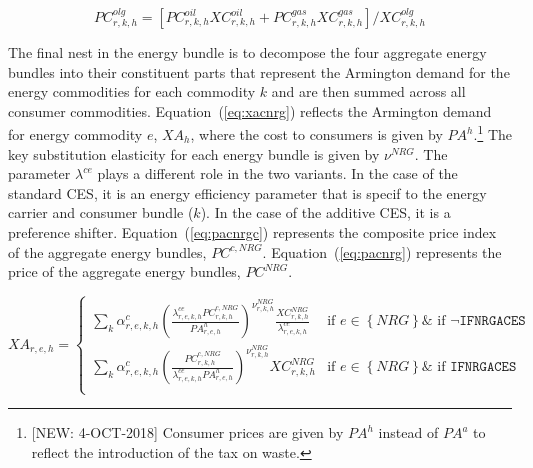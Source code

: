 \documentclass[11pt,letterpaper]{report}
\begin{document}
\begin{equation}
\label{eq:pcolg}
\mathit{PC}^{\mathit{olg}}_{r,k,h} =
\left[
\mathit{PC}^{\mathit{oil}}_{r,k,h} \mathit{XC}^{\mathit{oil}}_{r,k,h}
+ \mathit{PC}^{\mathit{gas}}_{r,k,h} \mathit{XC}^{\mathit{gas}}_{r,k,h}
\right]
\bigg / \mathit{XC}^{\mathit{olg}}_{r,k,h}
\end{equation}

The final nest in the energy bundle is to decompose the four aggregate energy
bundles into their constituent parts that represent the Armington demand for the
energy commodities for each commodity $k$ and are then summed across all
consumer commodities. Equation~(\ref{eq:xacnrg}) reflects the Armington demand
for energy commodity $e$, $\mathit{XA}_h$, where the cost to consumers is given
by $\mathit{PA^h}$.\footnote{[NEW: 4-OCT-2018] Consumer prices are
given by $\mathit{PA}^h$ instead of $\mathit{PA}^a$ to reflect the introduction of the
tax on waste.} The key substitution elasticity for each energy bundle is
given by $\nu^{\mathit{NRG}}$.
The parameter $\lambda^{\mathit{ce}}$ plays a different role in the two
variants. In the case of the standard CES, it is an energy efficiency
parameter that is specif to the energy carrier and consumer bundle ($k$).
In the case of the additive CES, it is a preference shifter.
Equation~(\ref{eq:pacnrgc}) represents the composite price
index of the aggregate energy bundles, $\mathit{PC^{c,\mathit{NRG}}}$.
Equation~(\ref{eq:pacnrg}) represents the price
of the aggregate energy bundles, $\mathit{PC^{\mathit{NRG}}}$.

\begin{equation}
\label{eq:xacnrg}
\mathit{XA_{r,e,h}} =
\begin{cases}
   \displaystyle \sum_k{
      \alpha^{\mathit{c}}_{r,e,k,h}
      \left( \frac {\lambda^{\mathit{ce}}_{r,e,k,h}
         \mathit{PC}^{c,\mathit{NRG}}_{r,k,h}} {\mathit{PA}^h_{r,e,h}}
      \right)^{\nu^{\mathit{NRG}}_{r,k,h}}
      \frac {\mathit{XC}^{\mathit{NRG}}_{r,k,h}}
         {\lambda^{\mathit{ce}}_{r,e,k,h}}
   }
   & \textrm{if } e \in \left\{ \mathit{NRG} \right\} \& \textrm{ if } \lnot \texttt{IFNRGACES} \\
   \displaystyle \sum_k{
         \alpha^{\mathit{c}}_{r,e,k,h}
         \left( \frac {\mathit{PC}^{c,\mathit{NRG}}_{r,k,h}}
         {\lambda^{\mathit{ce}}_{r,e,k,h} \mathit{PA}^h_{r,e,h}}
         \right)^{\nu^{\mathit{NRG}}_{r,k,h}}
         {\mathit{XC}^{\mathit{NRG}}_{r,k,h}}
      }
      & \textrm{if } e \in \left\{ \mathit{NRG} \right\} \& \textrm{ if } \texttt{IFNRGACES} \\
\end{cases}
\end{equation}
\end{document}
